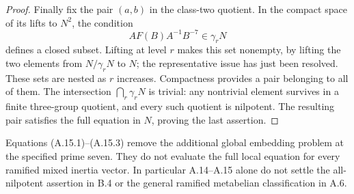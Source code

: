 \begin{proof}
Finally fix the pair $(a,b)$ in the class-two quotient. In
the compact space of its lifts to $N^2$, the condition
\[
 A F(B)A^{-1}B^{-7}\in\gamma_rN
\]
defines a closed subset. Lifting at level $r$ makes this set
nonempty, by lifting the two elements from $N/\gamma_rN$
to $N$; the representative issue has just been resolved.
These sets are nested as $r$ increases. Compactness provides
a pair belonging to all of them. The intersection
$\bigcap_r\gamma_rN$ is trivial: any nontrivial element
survives in a finite three-group quotient, and every such
quotient is nilpotent. The resulting pair satisfies the full
equation in $N$, proving the last assertion.
\end{proof}

Equations (A.15.1)--(A.15.3) remove the additional global
embedding problem at the specified prime seven. They do not
evaluate the full local equation for every ramified mixed
inertia vector. In particular A.14--A.15 alone do not settle
the all-nilpotent assertion in B.4 or the general ramified
metabelian classification in A.6.

